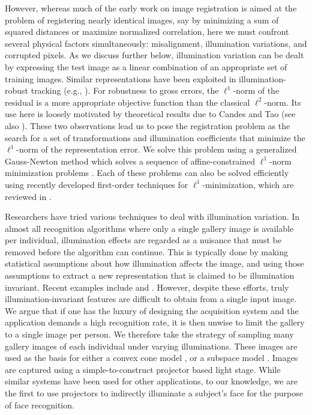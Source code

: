 \documentclass[12pt,journal,draftcls,letterpaper,onecolumn]{IEEEtran}
\begin{document}
However, whereas much of the early work on image registration is aimed at the
problem of registering nearly identical images, say by minimizing a sum of
squared distances or maximize normalized correlation, here we must confront several physical factors
simultaneously: misalignment, illumination variations, and corrupted pixels.
As we discuss further below, illumination variation can be dealt by
expressing the test image as a linear combination of an appropriate set of
training images. Similar representations have been exploited in
illumination-robust tracking (e.g., \cite{Belhumeur1999-PAA,Murase1995-IJCV}).
For robustness to gross errors, the $\ell^1$-norm of the residual is a more
appropriate objective function than the classical $\ell^2$-norm. Its use here
is loosely motivated by theoretical results due to Candes and Tao
\cite{CandesE2005-IT} (see also \cite{Wright2008-IT}). These two observations
lead us to pose the registration problem as the search for a set of
transformations and illumination coefficients that minimize the $\ell^1$-norm
of the representation error. We solve this problem using a generalized
Gauss-Newton method which solves a sequence of affine-constrained $\ell^1$-norm
minimization problems \cite{Osborne1990-JAMSSB,Jittorntrum1980-NM}. Each of
these problems can also be solved efficiently using recently developed
first-order techniques for $\ell^1$-minimization, which are reviewed in
\cite{YangA2010-pp}.

Researchers have tried various techniques to deal with illumination variation.
In almost all recognition algorithms where only a single gallery image is
available per individual, illumination effects are regarded as a nuisance that
must be removed before the algorithm can continue.  This is typically done by
making statistical assumptions about how illumination affects the image, and
using those assumptions to extract a new representation that is claimed to be
illumination invariant.  Recent examples include \cite{chen2006total} and
\cite{zhou2007appearance}.  However, despite these efforts, truly
illumination-invariant features are difficult to obtain from a single input
image.  We argue that if one has the luxury of designing the acquisition system 
and the application demands a high recognition rate,
it is then unwise to limit the gallery to a
single image per person.  We therefore take the strategy of sampling many
gallery images of each individual under varying illuminations.  These images
are used as the basis for either a convex cone model
\cite{Georghiades2001-PAMI,belhumeur1998set}, or a subspace model
\cite{Basri2003-PAMI}.  Images are captured using a simple-to-construct
projector based light stage.  While similar systems have been used for
other applications, to our knowledge, we
are the first to use projectors to indirectly illuminate a subject's face for
the purpose of face recognition.
\end{document}
